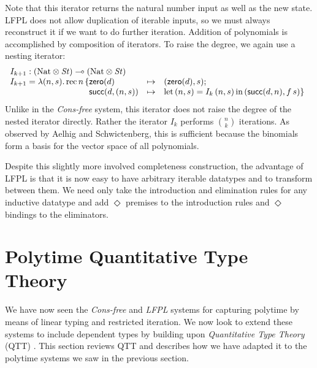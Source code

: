 \documentclass[acmsmall,screen]{acmart}
\newcommand{\tmRec}{\mathrm{rec}}
\newcommand{\tyNat}{\mathrm{Nat}}
\newcommand{\conZero}{\mathsf{zero}}
\newcommand{\conSucc}{\mathsf{succ}}
\newcommand{\Let}{\mathrm{let}}
\newcommand{\In}{\mathrm{in}}
\begin{document}
Note that this iterator returns the natural number input as well as
the new state. LFPL does not allow duplication of iterable inputs, so
we must always reconstruct it if we want to do further
iteration. Addition of polynomials is accomplished by composition of
iterators. To raise the degree, we again use a nesting iterator:
\begin{displaymath}
  \begin{array}{l}
    I_{k+1} : (\tyNat \otimes \mathit{St}) \multimap (\tyNat \otimes \mathit{St}) \\
    I_{k+1} = \lambda (n,s).\,\tmRec\,n\,\{
    \begin{array}[t]{@{}lcl}
      \conZero(d)&\mapsto&(\conZero(d),s); \\
      \conSucc(d,(n,s)) &\mapsto& \Let\,(n,s)=I_k\,(n,s)\,\In\,(\conSucc(d,n), f\,s) \}
    \end{array}
  \end{array}
\end{displaymath}
Unlike in the \emph{Cons-free} system, this iterator does not raise
the degree of the nested iterator directly. Rather the iterator $I_k$
performs $\binom{n}{k}$ iterations. As observed by Aelhig and
Schwictenberg, this is sufficient because the binomials form a basis
for the vector space of all polynomials.

Despite this slightly more involved completeness construction, the
advantage of LFPL is that it is now easy to have arbitrary iterable
datatypes and to transform between them. We need only take the
introduction and elimination rules for any inductive datatype and add
$\Diamond$ premises to the introduction rules and $\Diamond$ bindings
to the eliminators.

\section{Polytime Quantitative Type Theory}
\label{sec:qtt}

We have now seen the \emph{Cons-free} and \emph{LFPL} systems for
capturing polytime by means of linear typing and restricted
iteration. We now look to extend these systems to include dependent
types by building upon \emph{Quantitative Type Theory} (QTT)
\cite{atkey18qtt,mcbride16}. This section reviews QTT and describes
how we have adapted it to the polytime systems we saw in the previous
section.
\end{document}
